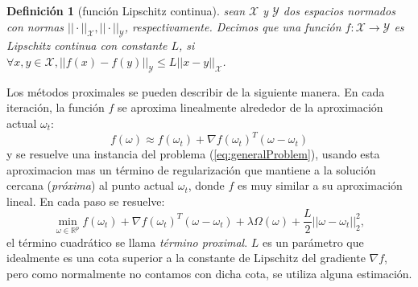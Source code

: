 \documentclass[12pt,draftcls, onecolumn, letterpaper,compsoc]{IEEEtran}
\newtheorem{definition}{\textbf{Definici\'{o}n}}
\begin{document}
\begin{definition}[funci\'{o}n Lipschitz continua]
    sean $\mathcal{X}$ y $\mathcal{Y}$ dos espacios normados con normas $||\cdot||_{\mathcal{X}}, ||\cdot||_{\mathcal{Y}}$, respectivamente. Decimos que una funci\'{o}n $f:\mathcal{X} \rightarrow \mathcal{Y}$ es {\it Lipschitz continua} con constante $L$, si $\forall x,y\in\mathcal{X}, ||f(x) - f(y)||_{\mathcal{Y}} \leq L ||x-y||_{\mathcal{X}}$.\\
\end{definition}

Los m\'{e}todos proximales se pueden describir de la siguiente manera. En cada iteraci\'{o}n, la funci\'{o}n $f$ se aproxima linealmente alrededor de la aproximaci\'{o}n actual $\omega_t$:
\begin{equation}\label{eq:prox_approx}
    f(\omega) \approx f(\omega_t) + \nabla f(\omega_t)^{T}(\omega - \omega_t)
\end{equation}
y se resuelve una instancia del problema (\ref{eq:generalProblem}), usando esta aproximacion mas un t\'{e}rmino de regularizaci\'{o}n que mantiene a la soluci\'{o}n cercana ({\it pr\'{o}xima}) al punto actual $\omega_t$, donde $f$ es muy similar a su aproximaci\'{o}n lineal. En cada paso se resuelve:
\begin{equation}\label{eq:prox_iter}
    \min_{\omega \in \mathbb{R}^{p}} f(\omega_t) + \nabla f(\omega_t)^{T}(\omega - \omega_t) + \lambda\Omega(\omega) + \frac{L}{2}||\omega - \omega_t||^{2}_2,
\end{equation}
el t\'{e}rmino cuadr\'{a}tico se llama {\it t\'{e}rmino proximal}. $L$ es un par\'{a}metro que idealmente es una cota superior a la constante de Lipschitz del gradiente $\nabla f$, pero como normalmente no contamos con dicha cota, se utiliza alguna estimaci\'{o}n.\\
\end{document}
